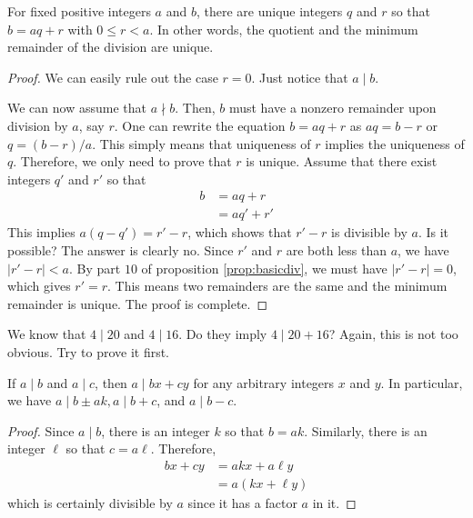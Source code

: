 \documentclass{subfile}
\begin{document}
	\begin{proposition}
		For fixed positive integers $a$ and $b$, there are unique integers $q$ and $r$ so that $b=aq+r$ with $0\leq r<a$. In other words, the quotient and the minimum remainder of the division are unique.
	\end{proposition}

	\begin{proof}
		We can easily rule out the case $r=0$. Just notice that $a\mid b$.

		We can now assume that $a\nmid b$. Then, $b$ must have a nonzero remainder upon division by $a$, say $r$. One can rewrite the equation $b=aq+r$ as $aq=b-r$ or $q=(b-r)/a$. This simply means that uniqueness of $r$ implies the uniqueness of $q$. Therefore, we only need to prove that $r$ is unique. Assume that there exist integers $q'$ and $r'$ so that
		\begin{align*}
			b
				& =aq+r\\
				& =aq'+r'
		\end{align*}
		This implies $a(q-q')=r'-r$, which shows that $r'-r$ is divisible by $a$. Is it possible? The answer is clearly no. Since $r'$ and $r$ are both less than $a$, we have $|r'-r|<a$. By part $10$ of proposition \eqref{prop:basicdiv}, we must have $|r'-r|=0$, which gives $r'=r$. This means two remainders are the same and the minimum remainder is unique. The proof is complete.
	\end{proof}


	\begin{question}
		We know that $4\mid 20$ and $4\mid 16$. Do they imply $4\mid 20+16$? Again, this is not too obvious. Try to prove it first.
	\end{question}

	\begin{proposition}\label{prop:a|bx+cy}
		If $a\mid b$ and $a\mid c$, then $a\mid bx+cy$ for any arbitrary integers $x$ and $y$. In particular, we have $a\mid b\pm ak,a\mid b+c$, and $a\mid b-c$.
	\end{proposition}

	\begin{proof}
		Since $a\mid b$, there is an integer $k$ so that $b=ak$. Similarly, there is an integer $\ell$ so that $c=a\ell$. Therefore,
		\begin{align*}
			bx+cy
				& =akx+a\ell y\\
				& =a(kx+\ell y)
		\end{align*}
		which is certainly divisible by $a$ since it has a factor $a$ in it.
	\end{proof}
\end{document}
